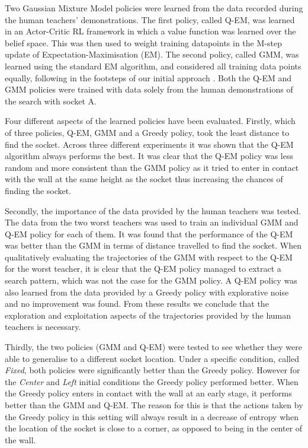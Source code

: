Two Gaussian Mixture Model policies were learned from the data recorded during the human teachers' demonstrations. 
The first policy, called Q-EM, was learned in an Actor-Critic RL framework in which a value function was learned over 
the belief space. This was then used to weight training datapoints in the M-step update of Expectation-Maximisation (EM). The second 
policy, called GMM, was learned using the standard EM algorithm, and considered all training data points equally,
following in the footsteps of our initial approach \cite{Chambrier2014}. Both the Q-EM and GMM policies were trained 
with data solely from the human demonstrations of the search with socket A.

Four different aspects of the learned policies have been evaluated. Firstly, which of three policies, Q-EM, GMM and a Greedy policy, 
took the least distance to find the socket. Across three different experiments it was shown that the Q-EM algorithm always performs
the best. It was clear that the Q-EM policy was less random and more consistent than the GMM policy as it tried to enter in 
contact with the wall at the same height as the socket thus increasing the chances of finding the socket.

Secondly, the importance of the data provided by the human teachers was tested. The data from the two worst teachers was used to 
train an individual GMM and Q-EM policy for each of them. It was found that the performance of the Q-EM was better than the GMM in terms 
of distance travelled to find the socket. When qualitatively evaluating the trajectories of the GMM with respect to the 
Q-EM for the worst teacher, it is clear that the Q-EM policy managed to extract a search pattern, which was not the case 
for the GMM policy. A Q-EM policy was also learned from the data provided by a Greedy policy with explorative noise 
and no improvement was found. From these results we conclude that the exploration and exploitation aspects of the trajectories 
provided by the human teachers is necessary.

Thirdly, the two policies (GMM and Q-EM) were tested to see whether they were able to generalise to a different socket location. 
Under a specific condition, called \textit{Fixed}, both policies were significantly better than the Greedy policy. However for the \textit{Center}
and \textit{Left} initial conditions the Greedy policy performed better. When the Greedy policy 
enters in contact with the wall at an early stage, it performs better than the GMM and Q-EM. The reason for this is that  
the actions taken by the Greedy policy in this setting will always result in a decrease of entropy when the location
of the socket is close to a corner, as opposed to being in the center of the wall.

